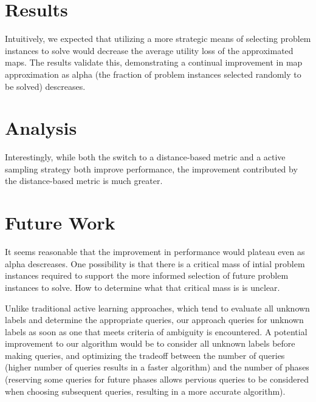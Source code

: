\documentclass[letterpaper]{article}
\begin{document}
\section{Results}
Intuitively, we expected that utilizing a more strategic means of selecting problem instances to solve would decrease the average utility loss of the approximated maps.  The results validate this, demonstrating a continual improvement in map approximation as alpha (the fraction of problem instances selected randomly to be solved) descreases.



\section{Analysis}
Interestingly, while both the switch to a distance-based metric and a active sampling strategy both improve performance, the improvement contributed by the distance-based metric is much greater.

\section{Future Work}

It seems reasonable that the improvement in performance would plateau even as alpha descreases.  One possibility is that there is a critical mass of intial problem instances required to support the more informed selection of future problem instances to solve.  How to determine what that critical mass is is unclear.

Unlike traditional active learning approaches, which tend to evaluate all unknown labels and determine the appropriate queries, our approach queries for unknown labels as soon as one that meets criteria of ambiguity is encountered.  A potential improvement to our algorithm would be to consider all unknown labels before making queries, and optimizing the tradeoff between the number of queries (higher number of queries results in a faster algorithm) and the number of phases (reserving some queries for future phases allows pervious queries to be considered when choosing subsequent queries, resulting in a more accurate algorithm).
\end{document}
